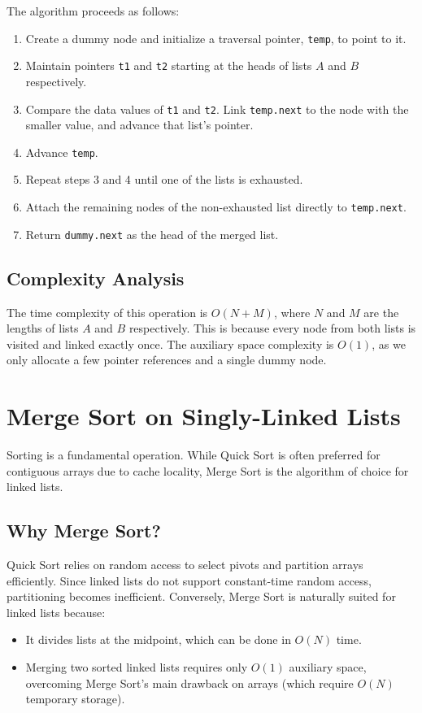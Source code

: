 \documentclass[10pt,journal,compsoc,onecolumn]{IEEEtran}
\begin{document}
The algorithm proceeds as follows:
\begin{enumerate}
    \item Create a dummy node and initialize a traversal pointer, \texttt{temp}, to point to it.
    \item Maintain pointers \texttt{t1} and \texttt{t2} starting at the heads of lists $A$ and $B$ respectively.
    \item Compare the data values of \texttt{t1} and \texttt{t2}. Link \texttt{temp.next} to the node with the smaller value, and advance that list's pointer.
    \item Advance \texttt{temp}.
    \item Repeat steps 3 and 4 until one of the lists is exhausted.
    \item Attach the remaining nodes of the non-exhausted list directly to \texttt{temp.next}.
    \item Return \texttt{dummy.next} as the head of the merged list.
\end{enumerate}

\subsection{Complexity Analysis}
The time complexity of this operation is $O(N + M)$, where $N$ and $M$ are the lengths of lists $A$ and $B$ respectively. This is because every node from both lists is visited and linked exactly once. The auxiliary space complexity is $O(1)$, as we only allocate a few pointer references and a single dummy node.

\section{Merge Sort on Singly-Linked Lists}
\label{sec:mergesort}
Sorting is a fundamental operation. While Quick Sort is often preferred for contiguous arrays due to cache locality, Merge Sort is the algorithm of choice for linked lists.

\subsection{Why Merge Sort?}
Quick Sort relies on random access to select pivots and partition arrays efficiently. Since linked lists do not support constant-time random access, partitioning becomes inefficient. Conversely, Merge Sort is naturally suited for linked lists because:
\begin{itemize}
    \item It divides lists at the midpoint, which can be done in $O(N)$ time.
    \item Merging two sorted linked lists requires only $O(1)$ auxiliary space, overcoming Merge Sort's main drawback on arrays (which require $O(N)$ temporary storage).
\end{itemize}
\end{document}
